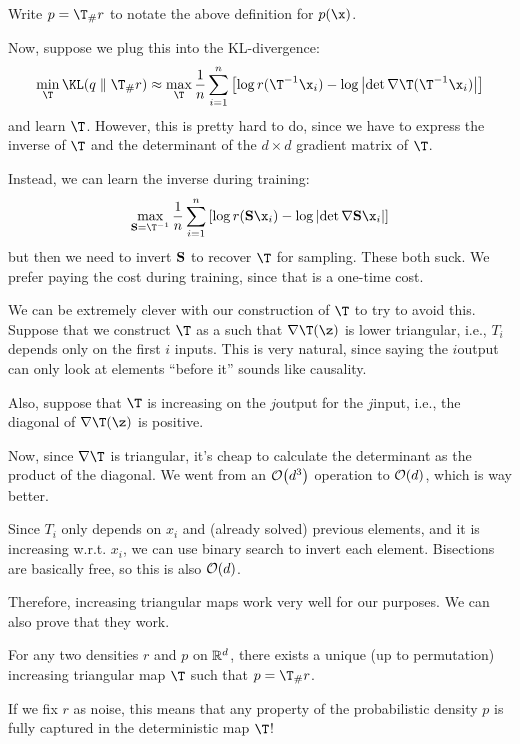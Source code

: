 \documentclass[class=cs480,notes,tikz]{agony}
\begin{document}
\begin{notation}
  Write $p = \T_\#r$ to notate the above definition for $p(\x)$.
\end{notation}

Now, suppose we plug this into the KL-divergence:
\[
  \min_{\T} \KL(q \parallel \T_\#r) \approx
  \max_{\T} \frac1n\sum_{i=1}^n\qty[\log r(\T^{-1}\x_i) - \log\abs{\det \nabla\T(\T^{-1}\x_i)}]
\]
and learn $\T$. However, this is pretty hard to do,
since we have to express the inverse of $\T$ and the determinant of the $d \times d$ gradient matrix of $\T$.

Instead, we can learn the inverse during training:
\[
  \max_{\vb S = \T^{-1}} \frac1n\sum_{i=1}^n\qty[\log r(\vb S\x_i) - \log\abs{\det \nabla\vb S\x_i}]
\]
but then we need to invert $\vb S$ to recover $\T$ for sampling.
These both suck.
We prefer paying the cost during training, since that is a one-time cost.

We can be extremely clever with our construction of $\T$ to try to avoid this.
Suppose that we construct $\T$ as a 
such that $\nabla \T(\z)$ is lower triangular, i.e.,
$T_i$ depends only on the first $i$ inputs.
This is very natural, since saying the $i$\xth output can only look at
elements ``before it'' sounds like causality.

Also, suppose that $\T$ is increasing on the $j$\xth output for the $j$\xth input,
i.e., the diagonal of $\nabla\T(\z)$ is positive.

Now, since $\nabla\T$ is triangular,
it's cheap to calculate the determinant as the product of the diagonal.
We went from an $\order{d^3}$ operation to $\order{d}$, which is way better.

Since $T_i$ only depends on $x_i$ and (already solved) previous elements,
and it is increasing w.r.t. $x_i$, we can use binary search to invert each element.
Bisections are basically free, so this is also $\order{d}$.

Therefore, increasing triangular maps work very well for our purposes.
We can also prove that they work.

\begin{theorem}
  For any two densities $r$ and $p$ on $\mathbb{R}^d$,
  there exists a unique (up to permutation) increasing triangular map $\T$
  such that $p = \T_\#r$.
\end{theorem}

If we fix $r$ as noise, this means that
any property of the probabilistic density $p$
is fully captured in the deterministic map $\T$!
\end{document}

